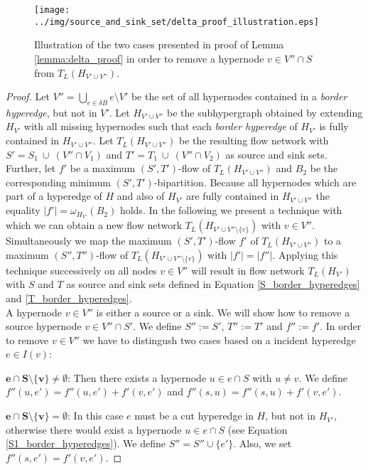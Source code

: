 \begin{figure}
\centering
\texttt{[image: ../img/source\_and\_sink\_set/delta\_proof\_illustration.eps]}
\caption{Illustration of the two cases presented in proof of Lemma \ref{lemma:delta_proof} in
         order to remove a hypernode $v \in V'' \cap S$ from $T_L(H_{V' \cup V''})$. }
\label{img:delta_proof_illustration}
\end{figure}

\begin{proof}
Let $V'' = \bigcup_{e \in \delta B} e \setminus V'$ be the set of all hypernodes contained
in a \emph{border hyperedge}, but not in $V'$. Let $H_{V' \cup V''}$ be the subhypergraph
obtained by extending $H_{V'}$ with all missing hypernodes such that 
each \emph{border hyperedge} of $H_{V'}$ is fully contained in $H_{V'\cup V''}$. 
Let $T_L(H_{V' \cup V''})$ be the resulting flow network with $S' = S_1\ \cup\ (V'' \cap V_1)$ and 
$T' = T_1\ \cup\ (V'' \cap V_2)$ as source and sink sets. Further, let $f'$ be a maximum $(S',T')$-flow 
of $T_L(H_{V' \cup V''})$ and $B_2$ be the corresponding minimum $(S',T')$-bipartition. Because
all hypernodes which are part of a hyperedge of $H$ and also of $H_{V'}$ are fully contained
in $H_{V' \cup V''}$ the equality $|f'| = \omega_{H_{V'}}(B_2)$ holds. In the following we 
present a technique with which we can obtain a new flow network $T_L(H_{V' \cup V''\setminus \{v\}})$
with $v \in V''$. Simultaneously we map
the maximum $(S',T')$-flow $f'$ of $T_L(H_{V' \cup V''})$ to a maximum $(S'',T'')$-flow
of $T_L(H_{V' \cup V''\setminus \{v\}})$ with $|f'| = |f''|$. Applying this technique successively
on all nodes $v \in V''$ will result in flow network $T_L(H_{V'})$ with $S$ and $T$ as source and sink sets
defined in Equation \ref{S_border_hyperedges} and \ref{T_border_hyperedges}. \\
A hypernode $v \in V''$ is either a source or a sink. We will show how to remove a source
hypernode $v \in V'' \cap S'$. We define $S'' := S'$, $T'' := T'$ and 
$f'' := f'$. In order to remove $v \in V''$ we have to distingush two cases 
based on a incident hyperedge $e \in I(v)$: 

$\mathbf{e \cap S \setminus \{v\} \neq \emptyset}$:
Then there exists a hypernode $u \in e \cap S$ with $u \neq v$. We define
$f''(u,e') = f''(u,e') + f'(v,e')$ and $f''(s,u) = f''(s,u) + f'(v,e')$. 

$\mathbf{e \cap S \setminus \{v\} = \emptyset}$:
In this case $e$ must be a cut hyperedge in $H$, but not in $H_{V'}$, otherwise
there would exist a hypernode $u \in e \cap S$ (see Equation \ref{S1_border_hyperedges}).
We define $S'' = S'' \cup \{e'\}$. Also, we set $f''(s,e') = f'(v,e')$. 


\end{proof}
